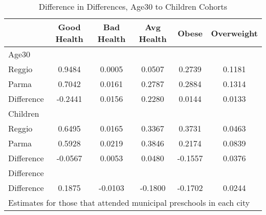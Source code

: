 \begin{table}[htbp]\centering
\caption{Difference in Differences, Age30 to Children Cohorts}
\begin{tabular}{l*{5}{c}}
\hline\hline
            & Good Health&  Bad Health&  Avg Health&       Obese&  Overweight\\
\hline
Age30       &            &            &            &            &            \\
Reggio      &      0.9484&      0.0005&      0.0507&      0.2739&      0.1181\\
Parma       &      0.7042&      0.0161&      0.2787&      0.2884&      0.1314\\
Difference  &     -0.2441&      0.0156&      0.2280&      0.0144&      0.0133\\
\hline
Children    &            &            &            &            &            \\
Reggio      &      0.6495&      0.0165&      0.3367&      0.3731&      0.0463\\
Parma       &      0.5928&      0.0219&      0.3846&      0.2174&      0.0839\\
Difference  &     -0.0567&      0.0053&      0.0480&     -0.1557&      0.0376\\
\hline
Difference  &            &            &            &            &            \\
Difference  &      0.1875&     -0.0103&     -0.1800&     -0.1702&      0.0244\\
\hline\hline
\multicolumn{6}{l}{\footnotesize Estimates for those that attended municipal preschools in each city}\\
\end{tabular}
\end{table}

